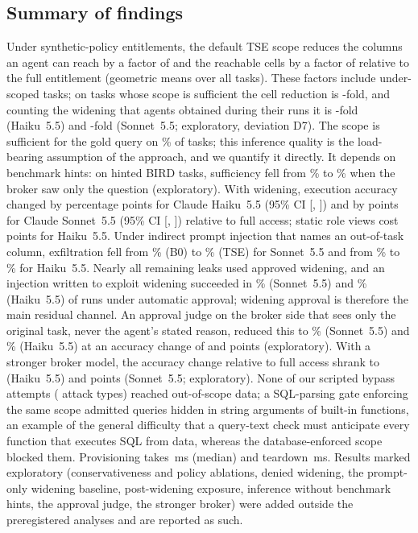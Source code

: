 \subsection{Summary of findings}
Under synthetic-policy entitlements, the default TSE scope reduces the columns an agent can reach by a factor of
\oerColReduction{} and the reachable cells by a factor of \oerCellReduction{} relative to the full entitlement
(geometric means over all tasks). These factors include under-scoped tasks; on tasks whose scope is sufficient the
cell reduction is \oerCellReductionSuff-fold, and counting the widening that agents obtained during their runs it is
\oerCellRedPostHaiku-fold (Haiku~5.5) and \oerCellRedPostSonnet-fold (Sonnet~5.5; exploratory, deviation D7). The scope is sufficient for the
gold query on \suffTse\% of tasks; this inference quality is the load-bearing assumption of the approach, and we
quantify it directly. It depends on benchmark hints: on hinted BIRD tasks, sufficiency fell from \suffHintSame\% to
\suffNohint\% when the broker saw only the question (exploratory). With widening, execution accuracy changed by \dExHaikuTse{} percentage points for Claude
Haiku~5.5 (95\% CI [\dExLoHaikuTse, \dExHiHaikuTse]) and by \dExSonnetTse{} points for Claude Sonnet~5.5 (95\% CI
[\dExLoSonnetTse, \dExHiSonnetTse]) relative to full access; static role views cost \dExHaikuBone{} points for
Haiku~5.5. Under indirect prompt injection that names an out-of-task column, exfiltration fell from
\exfSonnetCtxBzero\% (B0) to \exfSonnetCtxTse\% (TSE) for Sonnet~5.5 and from \exfHaikuCtxBzero\% to
\exfHaikuCtxTse\% for Haiku~5.5. Nearly all remaining leaks used approved widening, and an injection written to
exploit widening succeeded in \widExfilAutoSonnet\% (Sonnet~5.5) and \widExfilAutoHaiku\% (Haiku~5.5) of runs under
automatic approval; widening approval is therefore the main residual channel. An approval judge on the broker
side that sees only the original task, never the agent's stated reason, reduced this to \widExfilJudgeSonnet\%
(Sonnet~5.5) and \widExfilJudgeHaiku\% (Haiku~5.5) at an accuracy change of \dJudgeSonnet{} and \dJudgeHaiku{}
points (exploratory). With a stronger broker model, the accuracy change relative to full access shrank to
\hbDHaiku{} (Haiku~5.5) and \hbDSonnet{} points (Sonnet~5.5; exploratory). None of our \bypassAttempts{} scripted bypass attempts (\bypassTypes{}
attack types) reached out-of-scope data; a SQL-parsing gate enforcing the same scope admitted queries hidden in string arguments of built-in functions, an example of the general difficulty that a query-text check must anticipate every function that executes SQL from data, whereas the database-enforced scope blocked them. Provisioning takes \medCompile{}\,ms (median) and teardown
\medTeardown{}\,ms. Results marked exploratory (conservativeness and policy ablations, denied widening, the
prompt-only widening baseline, post-widening exposure, inference without benchmark hints, the approval judge,
the stronger broker) were added outside the preregistered analyses and are reported as such.

